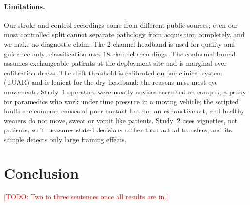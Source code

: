 \documentclass[sigconf,review,anonymous]{acmart}
\newcommand{\TODO}[1]{\textcolor{red}{[TODO: #1]}}
\begin{document}
\paragraph{Limitations.}
Our stroke and control recordings come from different public sources; even our most controlled split cannot separate pathology from acquisition completely, and we make no diagnostic claim.
The 2-channel headband is used for quality and guidance only; classification uses 18-channel recordings.
The conformal bound assumes exchangeable patients at the deployment site and is marginal over calibration draws.
The drift threshold is calibrated on one clinical system (TUAR) and is lenient for the dry headband; the reasons miss most eye movements.
Study~1 operators were mostly novices recruited on campus, a proxy for paramedics who work under time pressure in a moving vehicle; the scripted faults are common causes of poor contact but not an exhaustive set, and healthy wearers do not move, sweat or vomit like patients.
Study~2 uses vignettes, not patients, so it measures stated decisions rather than actual transfers, and its sample detects only large framing effects.

\section{Conclusion}
\TODO{Two to three sentences once all results are in.}



\end{document}
